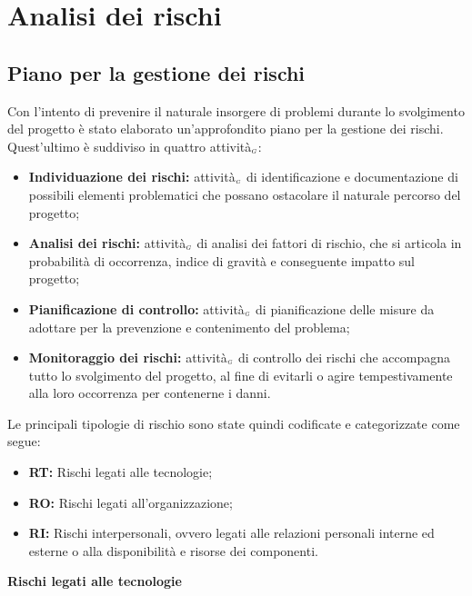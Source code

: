 \chapter{Analisi dei rischi}\label{AnalisiDeiRischi}

\section{Piano per la gestione dei rischi}\label{AnalisiDeiRischiPianoPerLaGestioneDeiRischi}
Con l'intento di prevenire il naturale insorgere di problemi durante lo svolgimento del progetto è stato elaborato un'approfondito piano per la gestione dei rischi. Quest'ultimo è suddiviso in quattro attività$_{\scaleto{G}{3pt}}$:
\begin{itemize}
  \item \textbf{Individuazione dei rischi:} attività$_{\scaleto{G}{3pt}}$ di identificazione e documentazione di possibili elementi problematici che possano ostacolare il naturale percorso del progetto;
  \item \textbf{Analisi dei rischi:} attività$_{\scaleto{G}{3pt}}$ di analisi dei fattori di rischio, che si articola in probabilità di occorrenza, indice di gravità e conseguente impatto sul progetto;
  \item \textbf{Pianificazione di controllo:} attività$_{\scaleto{G}{3pt}}$ di pianificazione delle misure da adottare per la prevenzione e contenimento del problema;
  \item \textbf{Monitoraggio dei rischi:} attività$_{\scaleto{G}{3pt}}$ di controllo dei rischi che accompagna tutto lo svolgimento del progetto, al fine di evitarli o agire tempestivamente alla loro occorrenza per contenerne i danni.
\end{itemize}
Le principali tipologie di rischio sono state quindi codificate e categorizzate come segue:
\begin{itemize}
  \item \textbf{RT:} Rischi legati alle tecnologie;
  \item \textbf{RO:} Rischi legati all'organizzazione;
  \item \textbf{RI:} Rischi interpersonali, ovvero legati alle relazioni personali interne ed esterne o alla disponibilità e risorse dei componenti.
\end{itemize} 

\quad
\begin{center}
	\LARGE\textbf{Rischi legati alle tecnologie}
\end{center}

